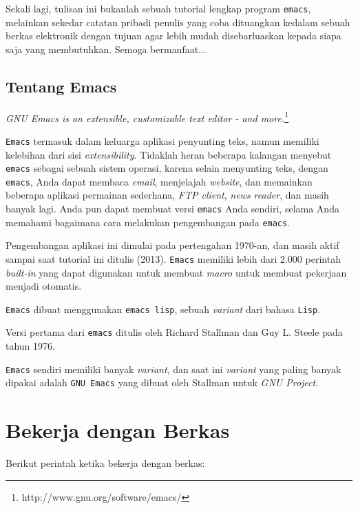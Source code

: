 \documentclass{article}
\begin{document}
Sekali lagi, tulisan ini bukanlah sebuah tutorial lengkap 
program \verb=emacs=, melainkan sekedar catatan pribadi penulis
yang coba dituangkan kedalam sebuah berkas elektronik dengan 
tujuan agar lebih mudah disebarluaskan kepada siapa saja yang
membutuhkan. Semoga bermanfaat...

\subsection{Tentang Emacs}

\emph{GNU Emacs is an extensible, customizable text editor - and more.}\footnote{http://www.gnu.org/software/emacs/}

\verb=Emacs= termasuk dalam keluarga aplikasi penyunting teks,
namun memiliki kelebihan dari sisi \emph{extensibility}. Tidaklah
heran beberapa kalangan menyebut \verb=emacs= sebagai sebuah sistem
operasi, karena selain menyunting teks, dengan \verb=emacs=, Anda dapat
membaca \emph{email}, menjelajah \emph{website}, dan memainkan 
beberapa aplikasi permainan sederhana, \emph{FTP client}, \emph{news reader},
dan masih banyak lagi. Anda pun dapat membuat versi \verb=emacs= Anda sendiri,
selama Anda memahami bagaimana cara melakukan pengembangan pada \verb=emacs=.

Pengembangan aplikasi ini dimulai pada pertengahan 1970-an, dan 
masih aktif sampai saat tutorial ini ditulis (2013). \verb=Emacs=
memiliki lebih dari 2.000 perintah \emph{built-in} yang dapat
digunakan untuk membuat \emph{macro} untuk membuat pekerjaan
menjadi otomatis.

\verb=Emacs= dibuat menggunakan \verb=emacs lisp=, sebuah
\emph{variant} dari bahasa \verb=Lisp=.

Versi pertama dari \verb=emacs= ditulis oleh Richard Stallman dan
Guy L. Steele pada tahun 1976.

\verb=Emacs= sendiri memiliki banyak \emph{variant}, dan saat ini
\emph{variant} yang paling banyak dipakai adalah \verb=GNU Emacs=
yang dibuat oleh Stallman untuk \emph{GNU Project}.

\section{Bekerja dengan Berkas}
Berikut perintah ketika bekerja dengan berkas:
\end{document}

